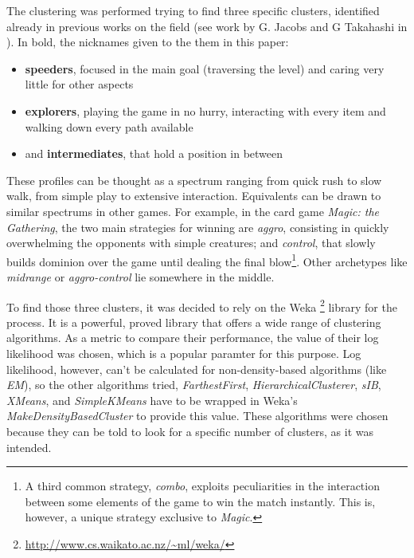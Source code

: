 \documentclass[conference]{IEEEtran}
\begin{document}
The clustering was performed trying to find three specific clusters, identified already in previous works on the field (see work by G. Jacobs and G Takahashi in \cite{mario2010}). In bold, the nicknames given to the them in this paper:

\begin{itemize}
	
	\item \textbf{speeders}, focused in the main goal (traversing the level) and caring very little for other aspects
	
	\item \textbf{explorers}, playing the game in no hurry, interacting with every item and walking down every path available
	
	\item and \textbf{intermediates}, that hold a position in between
	
\end{itemize}

These profiles can be thought as a spectrum ranging from quick rush to slow walk, from simple play to extensive interaction. Equivalents can be drawn to similar spectrums in other games. For example, in the card game \textit{Magic: the Gathering}, the two main strategies for winning are \textit{aggro}, consisting in quickly overwhelming the opponents with simple creatures; and \textit{control}, that slowly builds dominion over the game until dealing the final blow\footnote{A third common strategy, \textit{combo}, exploits peculiarities in the interaction between some elements of the game to win the match instantly. This is, however, a unique strategy exclusive to \textit{Magic}. }. Other archetypes like \textit{midrange} or \textit{aggro-control} lie somewhere in the middle. \cite{magicdecks}

To find those three clusters, it was decided to rely on the Weka \footnote{\url{http://www.cs.waikato.ac.nz/~ml/weka/}} library for the process. It is a powerful, proved library that offers a wide range of clustering algorithms. As a metric to compare their performance, the value of their log likelihood was chosen, which is a popular paramter for this purpose. Log likelihood, however, can't be calculated for non-density-based algorithms (like \textit{EM}), so the other algorithms tried, \textit{FarthestFirst}, \textit{HierarchicalClusterer}, \textit{sIB}, \textit{XMeans}, and \textit{SimpleKMeans} have to be wrapped in Weka's \textit{MakeDensityBasedCluster} to provide this value. These algorithms were chosen because they can be told to look for a specific number of clusters, as it was intended.
\end{document}

